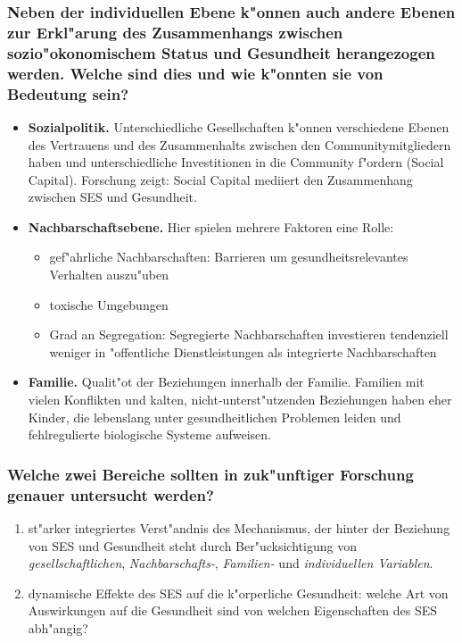 \subsubsection{Neben der individuellen Ebene k"onnen auch andere Ebenen zur Erkl"arung des Zusammenhangs zwischen sozio"okonomischem Status und Gesundheit herangezogen werden. Welche sind dies und wie k"onnten sie von Bedeutung sein?}
\begin{itemize}
        \item \textbf{Sozialpolitik.} Unterschiedliche Gesellschaften k"onnen verschiedene Ebenen des Vertrauens und des Zusammenhalts zwischen den Communitymitgliedern haben und unterschiedliche Investitionen in die Community f"ordern (Social Capital). Forschung zeigt: Social Capital mediiert den Zusammenhang zwischen SES und Gesundheit.
        \item \textbf{Nachbarschaftsebene.} Hier spielen mehrere Faktoren eine Rolle:
                \begin{itemize}
                        \item gef"ahrliche Nachbarschaften: Barrieren um gesundheitsrelevantes Verhalten auszu"uben
                        \item toxische Umgebungen 
                        \item Grad an Segregation: Segregierte Nachbarschaften investieren tendenziell weniger in "offentliche Dienstleistungen als integrierte Nachbarschaften
                \end{itemize}

        \item \textbf{Familie.} Qualit"ot der Beziehungen innerhalb der Familie. Familien mit vielen Konflikten und kalten, nicht-unterst"utzenden Beziehungen haben eher Kinder, die lebenslang unter gesundheitlichen Problemen leiden und fehlregulierte biologische Systeme aufweisen. 
\end{itemize}

\subsubsection{Welche zwei Bereiche sollten in zuk"unftiger Forschung genauer untersucht werden?}
\begin{enumerate}
        \item st"arker integriertes Verst"andnis des Mechanismus, der hinter der Beziehung von SES und Gesundheit steht durch Ber"ucksichtigung von \emph{gesellschaftlichen}, \emph{Nachbarschafts-}, \emph{Familien-} und \emph{individuellen Variablen}.
        \item dynamische Effekte des SES auf die k"orperliche Gesundheit: welche Art von Auswirkungen auf die Gesundheit sind von welchen Eigenschaften des SES abh"angig?
\end{enumerate}







	
